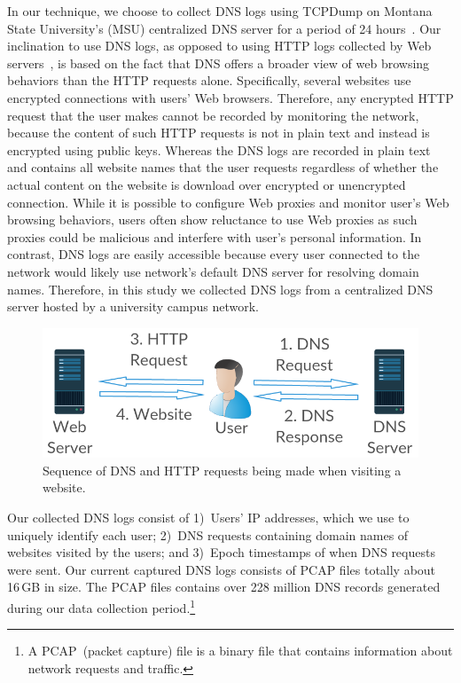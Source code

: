 \documentclass[letterpaper,twocolumn]{article}
\begin{document}
In our technique, we choose to collect DNS logs using TCPDump on Montana State University's (MSU) centralized DNS server for a period of 24 hours~\cite{dns:rfc}.
Our inclination to use DNS logs, as opposed to using HTTP logs collected by Web servers~\cite{http:rfc}, is based on the fact that DNS offers a broader view of web browsing behaviors than the HTTP requests alone.
Specifically, several websites use encrypted connections with users' Web browsers.
Therefore, any encrypted HTTP request that the user makes cannot be recorded by monitoring the network, because the content of such HTTP requests is not in plain text and instead is encrypted using public keys.
Whereas the DNS logs are recorded in plain text and contains all website names that the user requests regardless of whether the actual content on the website is download over encrypted or unencrypted connection.
While it is possible to configure Web proxies and monitor user's Web browsing behaviors, users often show reluctance to use Web proxies as such proxies could be malicious and interfere with user's personal information.
In contrast, DNS logs are easily accessible because every user connected to the network would likely use network's default DNS server for resolving domain names.
Therefore, in this study we collected DNS logs from a centralized DNS server hosted by a university campus network.

  \begin{figure}[t]
\centering
\includegraphics[width=0.8\linewidth]{img/dns_web_req}
\vspace{-5pt}
\caption{Sequence of DNS and HTTP requests being made when visiting a website.}
 \label{fig:dns_web_req}
  \vspace{-19pt}
 \end{figure}

Our collected DNS logs consist of 1)~Users’ IP addresses, which we use to uniquely identify each user; 2)~DNS requests containing domain names of websites visited by the users; and 3)~Epoch timestamps of when DNS requests were sent.
Our current captured DNS logs consists of PCAP files totally about 16\,GB in size.
The PCAP files contains over 228 million DNS records generated during our data collection period.\footnote{A PCAP~(packet capture) file is a binary file that contains information about network requests and traffic.}
\end{document}
